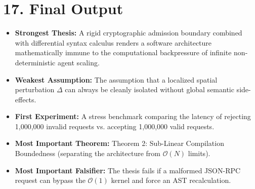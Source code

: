 \section{17. Final Output}
\begin{itemize}
    \item \textbf{Strongest Thesis:} A rigid cryptographic admission boundary combined with differential syntax calculus renders a software architecture mathematically immune to the computational backpressure of infinite non-deterministic agent scaling.
    \item \textbf{Weakest Assumption:} The assumption that a localized spatial perturbation $\Delta$ can always be cleanly isolated without global semantic side-effects.
    \item \textbf{First Experiment:} A stress benchmark comparing the latency of rejecting 1,000,000 invalid requests vs. accepting 1,000,000 valid requests.
    \item \textbf{Most Important Theorem:} Theorem 2: Sub-Linear Compilation Boundedness (separating the architecture from $\mathcal{O}(N)$ limits).
    \item \textbf{Most Important Falsifier:} The thesis fails if a malformed JSON-RPC request can bypass the $\mathcal{O}(1)$ kernel and force an AST recalculation.
\end{itemize}
